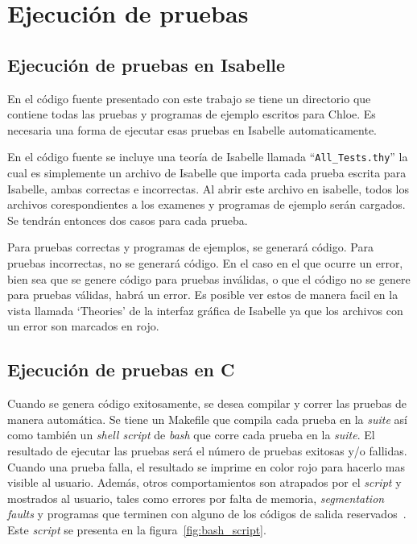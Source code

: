 \section{Ejecución de pruebas}

\subsection{Ejecución de pruebas en Isabelle}

En el código fuente presentado con este trabajo se tiene un directorio que contiene todas las pruebas y programas de ejemplo escritos para Chloe.
Es necesaria una forma de ejecutar esas pruebas en Isabelle automaticamente.

En el código fuente se incluye una teoría de Isabelle llamada ``\verb|All_Tests.thy|'' la cual es simplemente un archivo de Isabelle que importa cada prueba escrita para Isabelle, ambas correctas e incorrectas.
Al abrir este archivo en isabelle, todos los archivos corespondientes a los examenes y programas de ejemplo serán cargados.
Se tendrán entonces dos casos para cada prueba.

Para pruebas correctas y programas de ejemplos, se generará código.
Para pruebas incorrectas, no se generará código.
En el caso en el que ocurre un error, bien sea que se genere código para pruebas inválidas, o que el código no se genere para pruebas válidas, habrá un error.
Es posible ver estos de manera facil en la vista llamada `Theories' de la interfaz gráfica de Isabelle ya que los archivos con un error son marcados en rojo.

\subsection{Ejecución de pruebas en C}

Cuando se genera código exitosamente, se desea compilar y correr las pruebas de manera automática.
Se tiene un Makefile que compila cada prueba en la \textit{suite} así como también un \textit{shell script} de \textit{bash} que corre cada prueba en la \textit{suite}.
El resultado de ejecutar las pruebas será el número de pruebas exitosas y/o fallidas.
Cuando una prueba falla, el resultado se imprime en color rojo para hacerlo mas visible al usuario.
Además, otros comportamientos son atrapados por el \textit{script} y mostrados al usuario, tales como errores por falta de memoria, \textit{segmentation faults} y programas que terminen con alguno de los códigos de salida reservados~\cite{bash-scripting}.
Este \textit{script} se presenta en la figura~\ref{fig:bash_script}.

